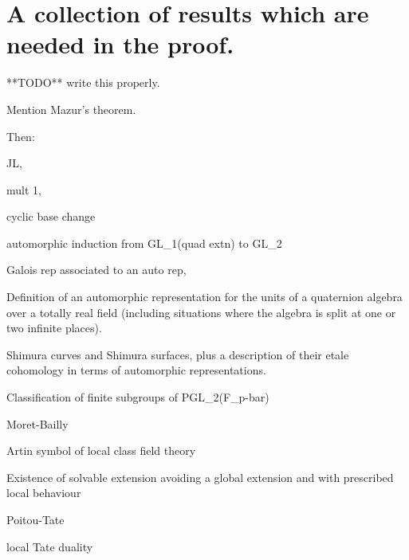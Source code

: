 \chapter{A collection of results which are needed in the proof.}

**TODO** write this properly.

Mention Mazur's theorem.

Then: 

JL, 

mult 1, 

cyclic base change

automorphic induction from GL_1(quad extn) to GL_2

Galois rep associated to an auto rep, 

Definition of an automorphic representation for the units of a quaternion algebra over a totally real field (including situations where the algebra is split at one or two infinite places).

Shimura curves and Shimura surfaces, plus a description of their etale cohomology in terms of automorphic representations.

Classification of finite subgroups of PGL_2(F_p-bar)

Moret-Bailly

Artin symbol of local class field theory

Existence of solvable extension avoiding a global extension and with prescribed local behaviour

Poitou-Tate

local Tate duality

